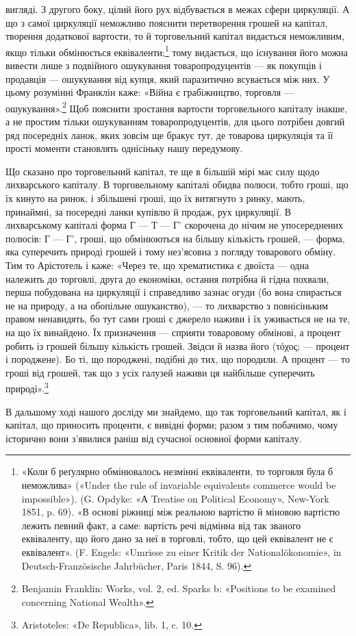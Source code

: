 \parcont{}  %
вигляді. З другого боку, цілий його рух відбувається в межах
сфери циркуляції. А що з самої циркуляції неможливо пояснити
перетворення грошей на капітал, творення додаткової вартости,
то й торговельний капітал видається неможливим, якщо тільки
обмінюється еквіваленти;\footnote{
«Коли б реґулярно обмінювалось незмінні еквіваленти, то торговля
була б неможлива» («Under the rule of invariable equivalents commerce
would be impossible»). (G. Opdyke: «А Treatise on Political Economy»,
New-York 1851, p. 69). «В основі ріжниці між реальною вартістю й
міновою вартістю лежить певний факт, а саме: вартість речі відмінна
від так званого еквіваленту, що його дано за неї в торговлі, тобто, що
цей еквівалент не є еквівалент». (F. Engels: «Umrisse zu einer Kritik
der Nationalökonomie», in Deutsch-Französische Jahrbücher, Paris 1844,
S. 96).
} тому видається, що існування його
можна вивести лише з подвійного ошукування товаропродуцентів —
як покупців і продавців — ошукування від купця, який паразитично
всувається між них. У цьому розумінні Франклін каже:
«Війна є грабіжництво, торговля — ошукування».\footnote{
Benjamin Franklin: Works, vol. 2, ed. Sparks b: «Positions to be
examined concerning National Wealth».
} Щоб пояснити
зростання вартости торговельного капіталу інакше, а не
простим тільки ошукуванням товаропродуцентів, для цього потрібен
довгий ряд посередніх ланок, яких зовсім ще бракує тут,
де товарова циркуляція та її прості моменти становлять однісіньку
нашу передумову.

Що сказано про торговельний капітал, те ще в більшій мірі
має силу щодо лихварського капіталу. В торговельному капіталі
обидва полюси, тобто гроші, що їх кинуто на ринок, і збільшені
гроші, що їх витягнуто з ринку, мають, принаймні, за посередні
ланки купівлю й продаж, рух циркуляції. В лихварському капіталі
форма Г — Т — Г' скорочена до нічим не упосереднених полюсів:
Г — Г', гроші, що обмінюються на більшу кількість грошей, —
форма, яка суперечить природі грошей і тому нез’ясовна з погляду
товарового обміну. Тим то Арістотель і каже: «Через те,
що хрематистика є двоїста — одна належить до торговлі, друга до
економіки, остання потрібна й гідна похвали, перша побудована
на циркуляції і справедливо зазнає огуди (бо вона спирається не
на природу, а на обопільне ошуканство), — то лихварство з повнісіньким
правом ненавидять, бо тут сами гроші є джерело наживи
і їх уживається не на те, на що їх винайдено. Їх призначення —
сприяти товаровому обмінові, а процент робить із грошей більшу
кількість грошей. Звідси й назва його (τόχος; — процент і породжене).
Бо ті, що породжені, подібні до тих, що породили. А процент
— то гроші від грошей, так що з усіх галузей наживи ця
найбільше суперечить природі».\footnote{
Aristoteles: «De Republica», lib. 1, c. 10.
}

В дальшому ході нашого досліду ми знайдемо, що так торговельний
капітал, як і капітал, що приносить проценти, є вивідні
форми; разом з тим побачимо, чому історично вони з’явилися
раніш від сучасної основної форми капіталу.
